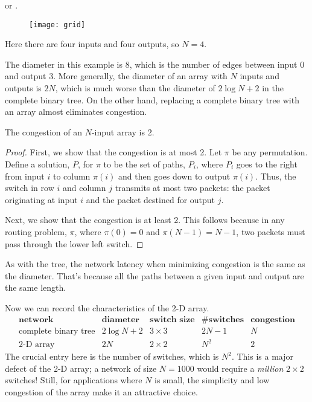 \begin{editingnotes}
or .
\end{editingnotes}
\begin{figure}
\texttt{[image: grid]}
\end{figure}
Here there are four inputs and four outputs, so $N = 4$.

The diameter in this example is 8, which is the number of edges between
input 0 and output 3.  More generally, the diameter of an array with $N$
inputs and outputs is $2N$, which is much worse than the diameter of $2
\log N + 2$ in the complete binary tree.  On the other hand, replacing a
complete binary tree with an array almost eliminates congestion.

\begin{theorem}
The congestion of an $N$-input array is 2.
\end{theorem}

\begin{proof}
First, we show that the congestion is at most 2.  Let $\pi$ be any
permutation.  Define a solution, $P$, for $\pi$ to be the set of paths,
$P_i$, where $P_i$ goes to the right from input $i$ to column $\pi(i)$ and
then goes down to output $\pi(i)$.  Thus, the switch in row $i$ and column
$j$ transmits at most two packets: the packet originating at input
$i$ and the packet destined for output $j$.

Next, we show that the congestion is at least 2.  This follows because in
any routing problem, $\pi$, where $\pi(0) = 0$ and $\pi(N-1) =
N-1$, two packets must pass through the lower left switch.
\end{proof}

As with the tree, the network latency when minimizing congestion is the
same as the diameter.  That's because all the paths between a given input
and output are the same length.

Now we can record the characteristics of the 2-D array.
%
\[
\begin{array}{r|c|c|c|c}
\textbf{network} &
\textbf{diameter} &
\textbf{switch size} &
\textbf{\# switches} &
\textbf{congestion} \\ \hline
\text{complete binary tree} & 2 \log N + 2 & 3 \times 3 & 2N - 1 & N \\
\text{2-D array} & 2 N & 2 \times 2 & N^2 & 2
\end{array}
\]
%
The crucial entry here is the number of switches, which is $N^2$.
This is a major defect of the 2-D array; a network of size $N = 1000$
would require a \textit{million} $2 \times 2$ switches!  Still, for
applications where $N$ is small, the simplicity and low congestion of
the array make it an attractive choice.


